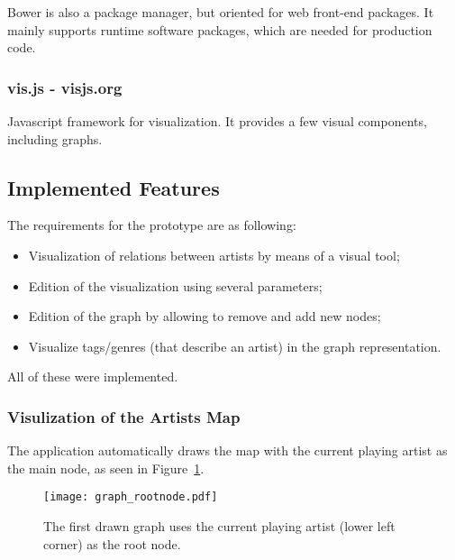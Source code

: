     Bower is also a package manager, but oriented for web front-end packages.
    It mainly supports runtime software packages, which are needed for production code.


    \subsubsection{vis.js - visjs.org} %
    \label{ssub:visjs}
      Javascript framework for visualization.
      It provides a few visual components, including graphs.


  \subsection{Implemented Features} %
    \label{sub:main_features}
    
    The requirements for the prototype are as following:

    \begin{itemize}
      \item Visualization of relations between artists by means of a visual tool;
      \item Edition of the visualization using several parameters;
      \item Edition of the graph by allowing to remove and add new nodes;
      \item Visualize tags/genres (that describe an artist) in the graph representation.
    \end{itemize}

    All of these were implemented.

    \subsubsection{Visulization of the Artists Map} %
      \label{ssub:visualization}
    
      The application automatically draws the map with the current playing artist as the main node, as seen in Figure~\ref{fig:graph_rootnode}.

      \begin{figure}[H]
        \begin{center}
          \texttt{[image: graph\_rootnode.pdf]}
        \end{center}
        \caption{The first drawn graph uses the current playing artist (lower left corner) as the root node.}
        \label{fig:graph_rootnode}
      \end{figure}

